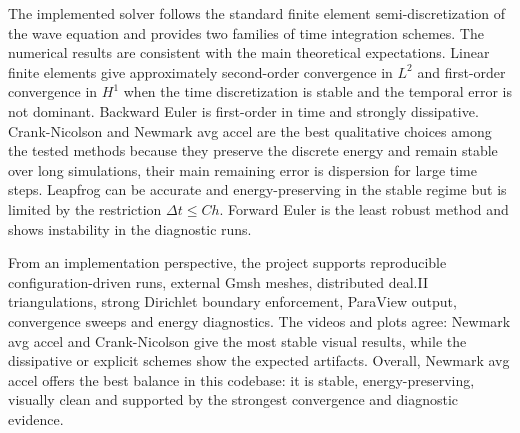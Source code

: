 \documentclass[11pt,a4paper]{article}
\newcommand{\dt}{\Delta t}
\begin{document}
The implemented solver follows the standard finite element semi-discretization
of the wave equation and provides two families of time integration schemes.  The
numerical results are consistent with the main theoretical expectations.  Linear
finite elements give approximately second-order convergence in $L^2$ and
first-order convergence in $H^1$ when the time discretization is stable and the
temporal error is not dominant.  Backward Euler is first-order in time and
strongly dissipative.  Crank-Nicolson and Newmark avg accel are the
best qualitative choices among the tested methods because they preserve the
discrete energy and remain stable over long simulations, their main remaining
error is dispersion for large time steps.  Leapfrog can be accurate and
energy-preserving in the stable regime but is limited by the restriction $\dt\le Ch$.
Forward Euler is the least robust method and shows instability in the diagnostic
runs.

From an implementation perspective, the project supports reproducible
configuration-driven runs, external Gmsh meshes, distributed deal.II
triangulations, strong Dirichlet boundary enforcement, ParaView output,
convergence sweeps and energy diagnostics.  The videos
and plots agree: Newmark avg accel and
Crank-Nicolson give the most stable visual results, while the dissipative or
explicit schemes show the expected artifacts.  Overall, Newmark avg accel
offers the best balance in this codebase: it is stable,
energy-preserving, visually clean and supported by the strongest convergence
and diagnostic evidence.



\end{document}
